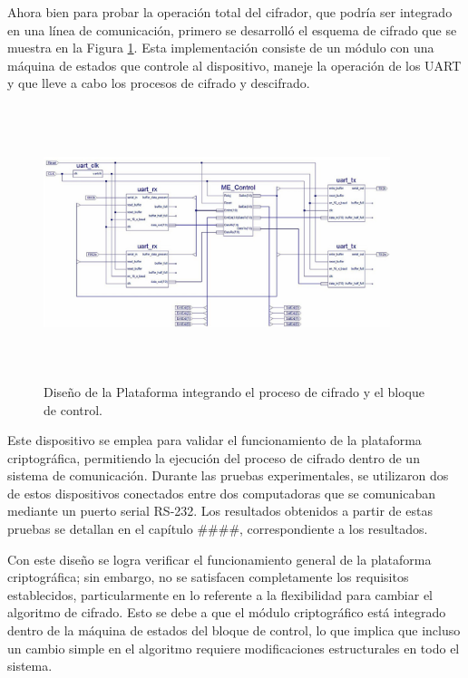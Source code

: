 Ahora bien para probar la operación total del cifrador, que podría ser integrado en una línea de comunicación, primero se desarrolló el esquema de cifrado que se muestra en la Figura \ref{fig:imagen6}. Esta implementación consiste de un módulo con una máquina de estados que controle al dispositivo, maneje la operación de los UART y que lleve a cabo los procesos de cifrado y descifrado. 

\begin{figure}[h!] %
    \centering %
     \includegraphics[width=0.9\textwidth, height=8cm]{imagenes/img6} %
    \caption{Diseño de la Plataforma integrando el proceso de cifrado y el bloque de control.}
    \label{fig:imagen6} %
\end{figure} 

Este dispositivo se emplea para validar el funcionamiento de la plataforma criptográfica, permitiendo la ejecución del proceso de cifrado dentro de un sistema de comunicación. Durante las pruebas experimentales, se utilizaron dos de estos dispositivos conectados entre dos computadoras que se comunicaban mediante un puerto serial RS-232. Los resultados obtenidos a partir de estas pruebas se detallan en el capítulo \#\#\#\#, correspondiente a los resultados.

Con este diseño se logra verificar el funcionamiento general de la plataforma criptográfica; sin embargo, no se satisfacen completamente los requisitos establecidos, particularmente en lo referente a la flexibilidad para cambiar el algoritmo de cifrado. Esto se debe a que el módulo criptográfico está integrado dentro de la máquina de estados del bloque de control, lo que implica que incluso un cambio simple en el algoritmo requiere modificaciones estructurales en todo el sistema.

